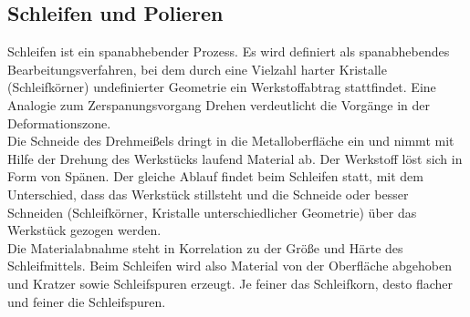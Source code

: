 \documentclass[12pt,a4paper,parskip,twoside,BCOR5mm,headsepline]{scrartcl}
\begin{document}
\subsection{Schleifen und Polieren}
Schleifen ist ein spanabhebender Prozess. Es wird definiert als spanabhebendes Bearbeitungsverfahren, bei dem durch eine Vielzahl harter Kristalle (Schleifkörner) undefinierter Geometrie ein Werkstoffabtrag stattfindet. \autocite[15]{hsp}  Eine Analogie zum Zerspanungsvorgang Drehen verdeutlicht die Vorgänge in der Deformationszone.\\
 Die Schneide des Drehmeißels dringt in die Metalloberfläche ein und nimmt mit Hilfe der Drehung des Werkstücks laufend Material ab. Der Werkstoff löst sich in Form von Spänen. Der gleiche Ablauf findet beim Schleifen statt, mit dem Unterschied, dass das Werkstück stillsteht und die Schneide oder besser Schneiden (Schleifkörner, Kristalle unterschiedlicher Geometrie) über das Werkstück gezogen werden.\\ Die Materialabnahme steht in Korrelation zu der Größe und Härte des Schleifmittels. Beim Schleifen wird also Material von der Oberfläche abgehoben und Kratzer sowie Schleifspuren erzeugt. Je feiner das Schleifkorn, desto flacher und feiner die Schleifspuren.  \autocite[16-17]{hsp}\\  
\end{document}
